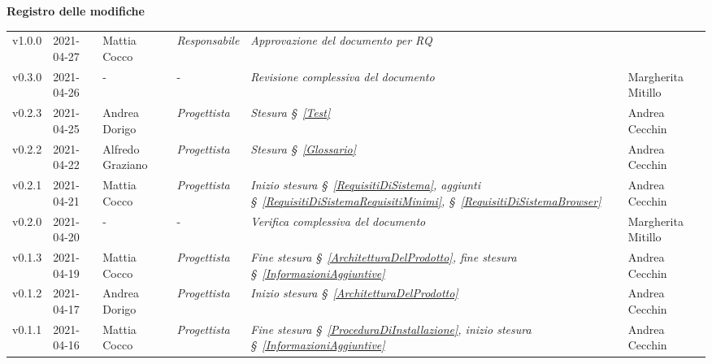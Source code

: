 \quad
\begin{center}
	\LARGE\textbf{Registro delle modifiche}
\end{center}
\def\tabularxcolumn#1{m{#1}}
{

\begin{center}
	\renewcommand{\arraystretch}{1.4}
	\begin{longtable}[c]{|p{2cm-1\tabcolsep}|p{2cm}|p{3cm-2\tabcolsep}|p{3cm-1.5\tabcolsep}|p{}|p{4cm-2\tabcolsep}|}
		\hline
		\rowcolor{airforceblue}
		\makecell[c]{\textbf{Versione}} & \makecell[c]{\textbf{Data}} & \makecell[c]{\textbf{Autore}} & \makecell[c]{\textbf{Ruolo}} & \makecell[c]{\textbf{Modifica}} &  \makecell[c]{\textbf{Verificatore}}\\
		\hline
		\centering v1.0.0 & 2021-04-27 & Mattia Cocco & \centering \textit{Responsabile} & \textit{Approvazione del documento per RQ}  & \makecell[c]{-}\\
		\hline
		\hline
		\centering v0.3.0 & 2021-04-26 &\centering - &\centering - & \textit{Revisione complessiva del documento} & Margherita Mitillo\\
		\hline
		\hline
		\centering v0.2.3 & 2021-04-25 & Andrea Dorigo & \centering \textit{Progettista} & \textit{Stesura \S~\ref{Test}} & Andrea Cecchin\\
		\hline
		\hline
		\centering v0.2.2 & 2021-04-22 & Alfredo Graziano & \centering \textit{Progettista} & \textit{Stesura \S~\ref{Glossario}} & Andrea Cecchin\\
		\hline
		\hline
		\centering v0.2.1 & 2021-04-21 & Mattia Cocco & \centering \textit{Progettista} & \textit{Inizio stesura \S~\ref{RequisitiDiSistema}, aggiunti \S~\ref{RequisitiDiSistemaRequisitiMinimi}, \S~\ref{RequisitiDiSistemaBrowser}} & Andrea Cecchin\\
		\hline
		\hline
		\centering v0.2.0 & 2021-04-20 & \centering- & \centering- & \textit{Verifica complessiva del documento} & Margherita Mitillo \\
		\hline
		\hline
		\centering v0.1.3 & 2021-04-19 & Mattia Cocco & \centering \textit{Progettista} & \textit{Fine stesura \S~\ref{ArchitetturaDelProdotto}, fine stesura \S~\ref{InformazioniAggiuntive}} & Andrea Cecchin\\
		\hline
		\hline
		\centering v0.1.2 & 2021-04-17 & Andrea Dorigo & \centering \textit{Progettista} & \textit{Inizio stesura \S~\ref{ArchitetturaDelProdotto}} & Andrea Cecchin\\
		\hline
		\hline
		\centering v0.1.1 & 2021-04-16 & Mattia Cocco & \centering \textit{Progettista} & \textit{Fine stesura \S~\ref{ProceduraDiInstallazione}, inizio stesura \S~\ref{InformazioniAggiuntive}} & Andrea Cecchin \\

\end{longtable}
\end{center}}

